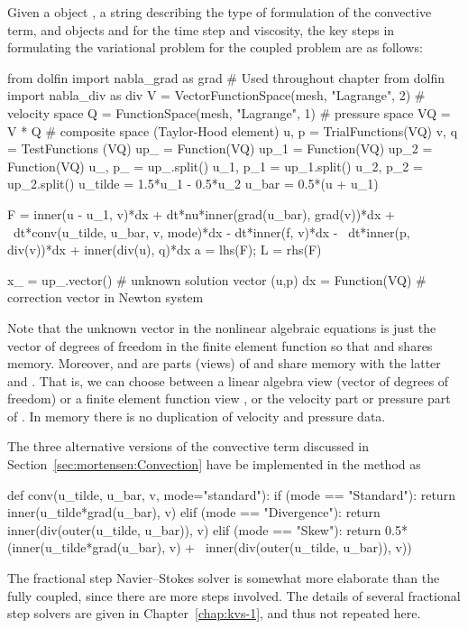 Given a  object , a string  describing
the type of formulation of the convective term, and 
objects  and  for the time step and viscosity, the key
steps in formulating the variational problem for the coupled problem
are as follows:
\begin{python}
from dolfin import nabla_grad as grad         # Used throughout chapter
from dolfin import nabla_div as div
V = VectorFunctionSpace(mesh, "Lagrange", 2)  # velocity space
Q = FunctionSpace(mesh, "Lagrange", 1)        # pressure space
VQ = V * Q  # composite space (Taylor-Hood element)
u, p = TrialFunctions(VQ)
v, q = TestFunctions (VQ)
up_  = Function(VQ)
up_1 = Function(VQ)
up_2 = Function(VQ)
u_, p_ = up_.split()
u_1, p_1 = up_1.split()
u_2, p_2 = up_2.split()
u_tilde = 1.5*u_1 - 0.5*u_2
u_bar = 0.5*(u + u_1)

F  = inner(u - u_1, v)*dx + dt*nu*inner(grad(u_bar), grad(v))*dx + \
     dt*conv(u_tilde, u_bar, v, mode)*dx - dt*inner(f, v)*dx - \
     dt*inner(p, div(v))*dx + inner(div(u), q)*dx
a = lhs(F); L = rhs(F)

x_ = up_.vector()  # unknown solution vector (u,p)
dx = Function(VQ)  # correction vector in Newton system
\end{python}
Note that the unknown vector  in the nonlinear algebraic
equations is just the vector of degrees of freedom in the 
finite element function so that \emp{up\_} and  shares
memory. Moreover, \emp{u\_} and \emp{p\_} are parts (views) of
 and share memory with the latter and \emp{x\_}.  That is,
we can choose between a linear algebra view \emp{x\_} (vector of
degrees of freedom) or a finite element function view , or
the velocity part \emp{u\_} or pressure part \emp{p\_} of \emp{up\_}.
In memory there is no duplication of velocity and pressure data.

The three alternative versions of the convective term discussed in
Section~\ref{sec:mortensen:Convection} have be implemented in the method
\emp{conv} as
\begin{python}
def conv(u_tilde, u_bar, v, mode="standard"):
    if (mode == "Standard"):
        return inner(u_tilde*grad(u_bar), v)
    elif (mode == "Divergence"):
        return inner(div(outer(u_tilde, u_bar)), v)
    elif (mode == "Skew"):
        return 0.5*(inner(u_tilde*grad(u_bar), v) + \
        inner(div(outer(u_tilde, u_bar)), v))
\end{python}
The fractional step Navier--Stokes solver is somewhat more elaborate
than the fully coupled, since there are more steps involved. The
details of several fractional step solvers are given in
Chapter~\ref{chap:kvs-1}, and thus not repeated here.

